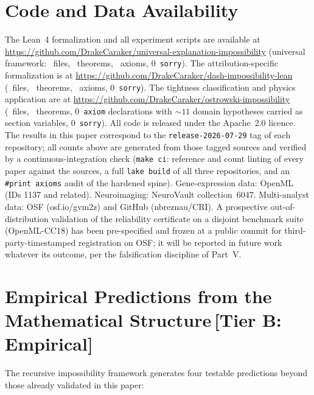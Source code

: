 \documentclass[11pt,a4paper]{article}
\begin{document}
\section*{Code and Data Availability}

The Lean~4 formalization and all experiment scripts are available at
\url{https://github.com/DrakeCaraker/universal-explanation-impossibility}
(universal framework: \ClaimMainFiles~files, \ClaimMainTheorems~theorems, \ClaimMainAxioms~axioms, 0~\texttt{sorry}).
The attribution-specific formalization is at
\url{https://github.com/DrakeCaraker/dash-impossibility-lean}
(\ClaimDashFiles~files, \ClaimDashTheorems~theorems, \ClaimDashAxioms~axioms, 0~\texttt{sorry}).
The tightness classification and physics application are at
\url{https://github.com/DrakeCaraker/ostrowski-impossibility}
(\ClaimOstrowskiFiles~files, \ClaimOstrowskiTheorems~theorems, 0~\texttt{axiom} declarations with ${\sim}11$ domain
hypotheses carried as section variables, 0~\texttt{sorry}).
All code is released under the Apache~2.0 licence.
The results in this paper correspond to the \texttt{release-2026-07-29} tag of
each repository; all counts above are generated from those tagged sources and
verified by a continuous-integration check (\texttt{make ci}: reference and
count linting of every paper against the sources, a full \texttt{lake build} of
all three repositories, and an \texttt{\#print axioms} audit of the hardened
spine).
Gene-expression data: OpenML (IDs 1137 and related).
Neuroimaging: NeuroVault collection~6047.
Multi-analyst data: OSF (osf.io/gvm2z) and GitHub (nbreznau/CRI).
A prospective out-of-distribution validation of the reliability certificate on a
disjoint benchmark suite (OpenML-CC18) has been pre-specified and frozen at a
public commit for third-party-timestamped registration on OSF; it will be
reported in future work whatever its outcome, per the falsification discipline of
Part~V.

\section{Empirical Predictions from the Mathematical Structure\,\textnormal{\normalsize[Tier B: Empirical]}}
\label{sec:predictions}

The recursive impossibility framework generates four testable predictions beyond those already validated in this paper:
\end{document}
